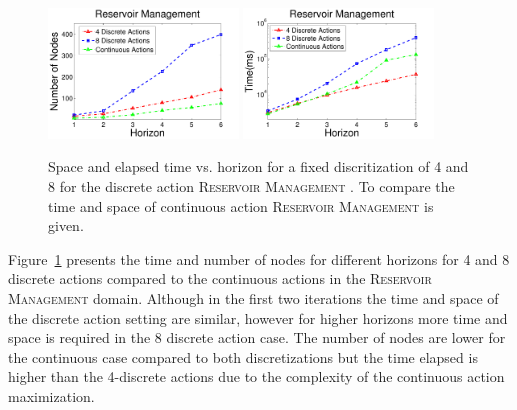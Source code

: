 \documentclass[twoside,11pt]{article}
\newcommand{\WaterReservoir}{\textsc{Reservoir Management }}
\begin{document}
\begin{figure}[tbp!]
\vspace{2mm}
\centering
\includegraphics[width=0.45\textwidth]{pics/DisResNode2.pdf}
\hspace{2mm}
\includegraphics[width=0.45\textwidth]{pics/DisResTime2.pdf}
\vspace{-2mm}
\caption{%
Space and elapsed time vs. horizon for a fixed discritization of 4 and 8 for the discrete action \WaterReservoir. To compare the time and space of continuous action \WaterReservoir is given. }
\label{fig:resDisTS}
\vspace{-5mm}
\end{figure}

Figure~\ref{fig:resDisTS} presents the time and number of nodes for different horizons for 4 and 8 discrete actions compared to the continuous actions in the \WaterReservoir domain. Although in the first two iterations the time and space of the discrete action setting are similar, however for higher horizons more time and space is required in the 8 discrete action case. The number of nodes are lower for the continuous case compared to both discretizations but the time elapsed is higher than the 4-discrete actions due to the complexity of the continuous action maximization.
\end{document}
